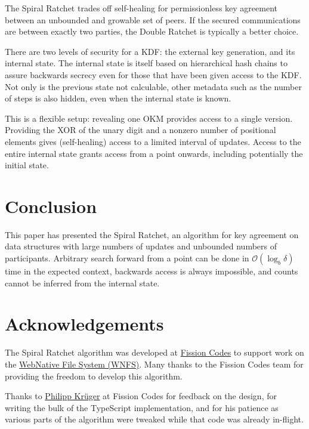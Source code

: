 \documentclass{article}
\begin{document}
	The Spiral Ratchet trades off self-healing for permissionless key agreement between an unbounded and growable set of peers. If the secured communications are between exactly two parties, the Double Ratchet is typically a better choice.
	
	There are two levels of security for a KDF: the external key generation, and its internal state. The internal state is itself based on hierarchical hash chains to assure backwards secrecy even for those that have been given access to the KDF. Not only is the previous state not calculable, other metadata such as the number of steps is also hidden, even when the internal state is known.
	
	This is a flexible setup: revealing one OKM provides access to a single version. Providing the XOR of the unary digit and a nonzero number of positional elements gives (self-healing) access to a limited interval of updates. Access to the entire internal state grants access from a point onwards, including potentially the initial state.
	
	\section{Conclusion}
	
	This paper has presented the Spiral Ratchet, an algorithm for key agreement on data structures with large numbers of updates and unbounded numbers of participants. Arbitrary search forward from a point can be done in $\mathcal{O}(\log_{b} \delta)$ time in the expected context, backwards access is always impossible, and counts cannot be inferred from the internal state.
    
    \newpage
    
    \section{Acknowledgements}
    
    The Spiral Ratchet algorithm was developed at \href{https://fission.codes}{Fission Codes} to support work on the \href{https://github.com/fission-suite/webnative}{WebNative File System (WNFS)}. Many thanks to the Fission Codes team for providing the freedom to develop this algorithm.
    
    Thanks to \href{https://github.com/matheus23/}{Philipp Krüger} at Fission Codes for  feedback on the design, for writing the bulk of the TypeScript implementation\cite{ts-wnfs-ratchet}, and for his patience as various parts of the algorithm were tweaked while that code was already in-flight.
    
\end{document}
